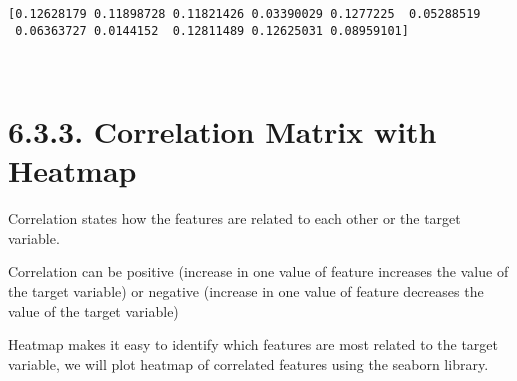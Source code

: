 \documentclass[11pt]{article}
\begin{document}
    \begin{Verbatim}[commandchars=\\\{\}]
[0.12628179 0.11898728 0.11821426 0.03390029 0.1277225  0.05288519
 0.06363727 0.0144152  0.12811489 0.12625031 0.08959101]

    \end{Verbatim}

    \begin{center}
    \end{center}
    { \hspace*{\fill} \\}
    
    \section{6.3.3. Correlation Matrix with
Heatmap}\label{correlation-matrix-with-heatmap}

Correlation states how the features are related to each other or the
target variable.

Correlation can be positive (increase in one value of feature increases
the value of the target variable) or negative (increase in one value of
feature decreases the value of the target variable)

Heatmap makes it easy to identify which features are most related to the
target variable, we will plot heatmap of correlated features using the
seaborn library.
\end{document}
